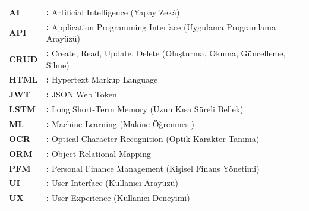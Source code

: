 \hspace{-3mm}
\begin{tabular}{p{2cm}l}
{\bf AI} & {\bf:} Artificial Intelligence (Yapay Zekâ)\\
{\bf API} & {\bf:} Application Programming Interface (Uygulama Programlama Arayüzü)\\
{\bf CRUD} & {\bf:} Create, Read, Update, Delete (Oluşturma, Okuma, Güncelleme, Silme)\\
{\bf HTML} & {\bf:} Hypertext Markup Language\\
{\bf JWT} & {\bf:} JSON Web Token\\
{\bf LSTM} & {\bf:} Long Short-Term Memory (Uzun Kısa Süreli Bellek)\\
{\bf ML} & {\bf:} Machine Learning (Makine Öğrenmesi)\\
{\bf OCR} & {\bf:} Optical Character Recognition (Optik Karakter Tanıma)\\
{\bf ORM} & {\bf:} Object-Relational Mapping\\
{\bf PFM} & {\bf:} Personal Finance Management (Kişisel Finans Yönetimi)\\
{\bf UI} & {\bf:} User Interface (Kullanıcı Arayüzü)\\
{\bf UX} & {\bf:} User Experience (Kullanıcı Deneyimi)\\
\end{tabular}
